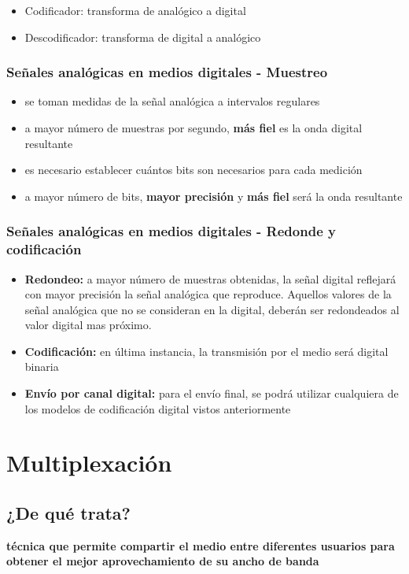\documentclass[11pt]{article}
\begin{document}
\begin{itemize}
\item Codificador: transforma de analógico a digital
\item Descodificador: transforma de digital a analógico
\end{itemize}

\subsubsection{Señales analógicas en medios digitales - Muestreo}
\label{sec:orgc3d83c8}
\begin{itemize}
\item se toman medidas de la señal analógica a intervalos regulares
\item a mayor número de muestras por segundo, \textbf{más fiel} es la onda digital resultante
\item es necesario establecer cuántos bits son necesarios para cada medición
\item a mayor número de bits, \textbf{mayor precisión} y \textbf{más fiel} será la onda resultante
\end{itemize}

\subsubsection{Señales analógicas en medios digitales - Redonde y codificación}
\label{sec:org3aec4b8}
\begin{itemize}
\item \textbf{Redondeo:} a mayor número de muestras obtenidas, la señal digital reflejará con mayor precisión la señal analógica que reproduce. Aquellos valores de la señal analógica que no se
consideran en la digital, deberán ser redondeados al valor digital mas próximo.
\item \textbf{Codificación:} en última instancia, la transmisión por el medio será digital binaria
\item \textbf{Envío por canal digital:} para el envío final, se podrá utilizar cualquiera de los modelos de codificación digital vistos anteriormente
\end{itemize}

\section{Multiplexación}
\label{sec:org17e3b12}
\subsection{¿De qué trata?}
\label{sec:org2cb277c}
\textbf{técnica que permite compartir el medio entre diferentes usuarios para obtener el mejor aprovechamiento de su ancho de banda}
\end{document}
